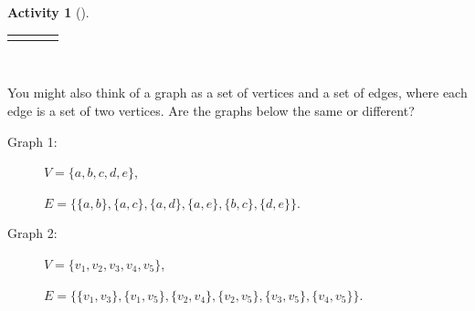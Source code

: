 \documentclass[10pt,]{book}
\theoremstyle{plain}
\theoremstyle{definition}
\theoremstyle{definition}
\theoremstyle{definition}
\newtheorem{activity}[project]{Activity}
\numberwithin{equation}{chapter}
\newlength{\panelmax}
\newcommand{\vtx}[2]{node[fill,circle,inner sep=0pt, minimum size=4pt,label=#1:#2]{}}
\renewcommand{\v}{\vtx{above}{}}
\begin{document}
\begin{activity}[]
{\begin{lrbox}{\panelboxDimage}
{{
}
}\end{lrbox}
\ifdefined\phDimage\else\newlength{\phDimage}\fi%
\setlength{\phDimage}{\ht\panelboxDimage+\dp\panelboxDimage}
\settototalheight{\phDimage}{\usebox{\panelboxDimage}}
\setlength{\panelmax}{\maxof{\panelmax}{\phDimage}}
\leavevmode%
\setlength{\tabcolsep}{0.035\linewidth}
\par\medskip\noindent
\hspace*{0.035\linewidth}%
\begin{tabular}{@{}*{4}{c}@{}}
\begin{minipage}[c][\panelmax][b]{0.18\linewidth}\usebox{\panelboxAimage}\end{minipage}&
\begin{minipage}[c][\panelmax][b]{0.18\linewidth}\usebox{\panelboxBimage}\end{minipage}&
\begin{minipage}[c][\panelmax][b]{0.18\linewidth}\usebox{\panelboxCimage}\end{minipage}&
\begin{minipage}[c][\panelmax][b]{0.18\linewidth}\usebox{\panelboxDimage}\end{minipage}\end{tabular}\\
}%
\par
\hypertarget{p-26}{}%
You might also think of a graph as a set of vertices and a set of edges, where each edge is a set of two vertices. Are the graphs below the same or different? \leavevmode%
\begin{description}
\item[{Graph 1:}]\hypertarget{li-1}{}\hypertarget{p-27}{}%
\(V = \{a, b, c, d, e\}\),%
\par
\hypertarget{p-28}{}%
\(E = \{\{a,b\}, \{a, c\}, \{a,d\}, \{a,e\}, \{b,c\}, \{d,e\}\}\).%
\item[{Graph 2:}]\hypertarget{li-2}{}\hypertarget{p-29}{}%
\(V = \{v_1, v_2, v_3, v_4, v_5\}\),%
\par
\hypertarget{p-30}{}%
\(E = \{\{v_1, v_3\}, \{v_1, v_5\}, \{v_2, v_4\}, \{v_2, v_5\}, \{v_3, v_5\}, \{v_4, v_5\}\}\).%
\end{description}
%
\end{activity}
\end{document}
